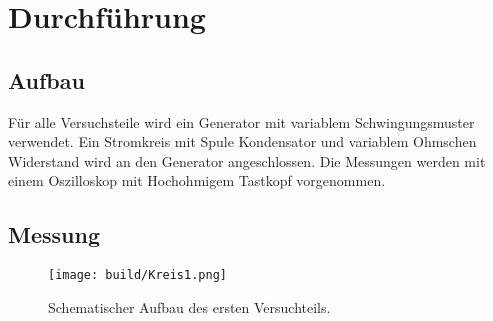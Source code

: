 \section{Durchführung}
\label{sec:Durchführung}


\subsection{Aufbau}

Für alle Versuchsteile wird ein Generator mit variablem Schwingungsmuster verwendet.
Ein Stromkreis mit Spule Kondensator und variablem Ohmschen Widerstand wird an den Generator angeschlossen.
Die Messungen werden mit einem Oszilloskop mit Hochohmigem Tastkopf vorgenommen. 

\subsection{Messung}

\begin{figure*}[h!]
    \centering
    \texttt{[image: build/Kreis1.png]}
    \caption{Schematischer Aufbau des ersten Versuchteils.\cite{V354}}
    \label{fig:Aufbau1}
\end{figure*}

